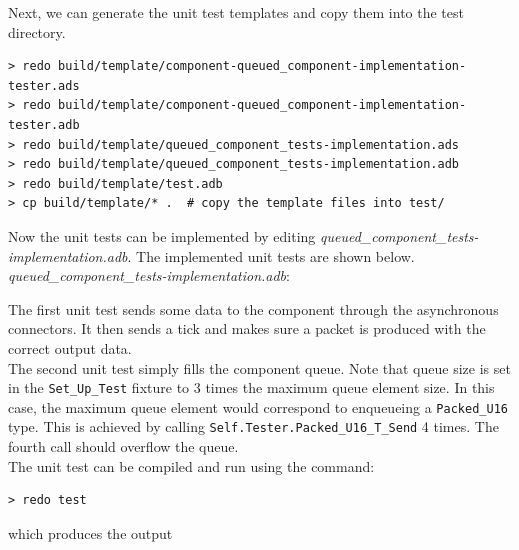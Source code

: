 Next, we can generate the unit test templates and copy them into the test directory.

\vspace{5mm} %
\begin{verbatim}
> redo build/template/component-queued_component-implementation-tester.ads
> redo build/template/component-queued_component-implementation-tester.adb
> redo build/template/queued_component_tests-implementation.ads
> redo build/template/queued_component_tests-implementation.adb
> redo build/template/test.adb
> cp build/template/* .  # copy the template files into test/
\end{verbatim}
\vspace{5mm} %

Now the unit tests can be implemented by editing \textit{queued\_component\_tests-implementation.adb}. The implemented unit tests are shown below. \\

\textit{queued\_component\_tests-implementation.adb}:

The first unit test sends some data to the component through the asynchronous connectors. It then sends a tick and makes sure a packet is produced with the correct output data. \\

The second unit test simply fills the component queue. Note that queue size is set in the \texttt{Set\_Up\_Test} fixture to 3 times the maximum queue element size. In this case, the maximum queue element would correspond to enqueueing a \texttt{Packed\_U16} type. This is achieved by calling \texttt{Self.Tester.Packed\_U16\_T\_Send} 4 times. The fourth call should overflow the queue. \\

The unit test can be compiled and run using the command:

\vspace{5mm} %
\begin{verbatim}
> redo test
\end{verbatim}
\vspace{5mm} %

which produces the output

\vspace{5mm} %
\inputminted{text}{../example_architecture/queued_component/test/output.txt}
\vspace{5mm} %

